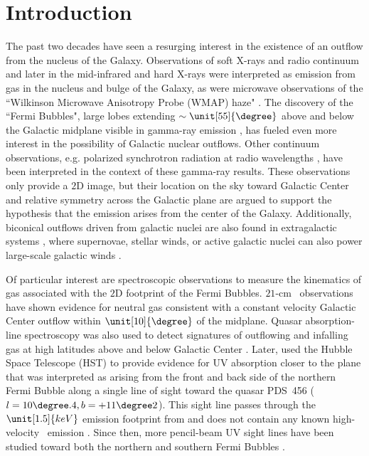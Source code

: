 \documentclass[twocolumn]{aastex63}
\newcommand{\hi}{\ion{H}{1}}
\begin{document}
\section{Introduction} \label{sec:intro}


The past two decades have seen a resurging interest in the existence of an outflow from the nucleus of the Galaxy. Observations of soft X-rays and radio continuum \citep{Snowden1997, Sofue2000, Almy2000} and later in the mid-infrared and hard X-rays \citep{JBH2003} were interpreted as emission from gas in the nucleus and bulge of the Galaxy, as were microwave observations of the ``Wilkinson Microwave Anisotropy Probe (WMAP) haze" \citep{Finkbeiner2004, Dobler2008}. The discovery of the ``Fermi Bubbles", large lobes extending $\sim \unit[55]{\degree}$ above and below the Galactic midplane visible in gamma-ray emission \citep{Su2010, Dobler2010, Ackermann2014}, has fueled even more interest in the possibility of Galactic nuclear outflows. Other continuum observations, e.g. polarized synchrotron radiation at radio wavelengths \citep{Carretti2013}, have been interpreted in the context of these gamma-ray results. These observations only provide a $2$D image, but their location on the sky toward Galactic Center and relative symmetry across the Galactic plane are argued to support the hypothesis that the emission arises from the center of the Galaxy. Additionally, biconical outflows driven from galactic nuclei are also found in extragalactic systems \citep{Bland1988, Cecil2001, Veilleux2002}, where supernovae, stellar winds, or active galactic nuclei can also power large-scale galactic winds \citep[see][for review]{Heckman2002,Veilleux2020}. 

Of particular interest are spectroscopic observations to measure the kinematics of gas associated with the $2$D footprint of the Fermi Bubbles. $21$-cm \hi\ observations have shown evidence for neutral gas consistent with a constant velocity Galactic Center outflow \citep{McClure-Griffiths2013, DiTeodoro2018, Lockman2020} within $\unit[10]{\degree}$ of the midplane. Quasar absorption-line spectroscopy was also used to detect signatures of outflowing and infalling gas at high latitudes above and below Galactic Center \citep{Keeney2006}. Later, \citet{Fox2015} used the Hubble Space Telescope (HST) to provide evidence for UV absorption closer to the plane that was interpreted as arising from the front and back side of the northern Fermi Bubble along a single line of sight toward the quasar PDS~456 ($l = 10\degree.4, b = +11\degree2$). This sight line passes through the $\unit[1.5]{keV}$ emission footprint from \citet{Snowden1997} and does not contain any known high-velocity \hi\ emission \citep[][constrained using the Green Bank Telescope]{Fox2015}. Since then, more pencil-beam UV sight lines have been studied toward both the northern and southern Fermi Bubbles \citep[e.g.][]{Bordoloi2017, Karim2018}. 
\end{document}
